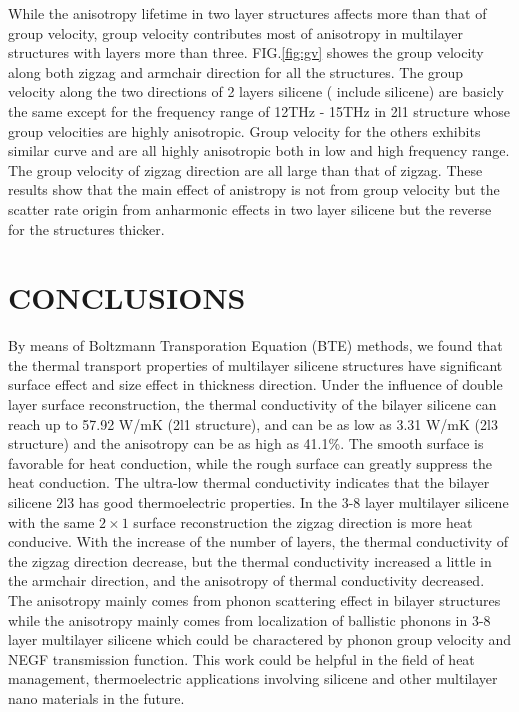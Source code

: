 \documentclass[%
 reprint,
 amsmath,amssymb,
 aps,
 prb,
]{revtex4-1}
\begin{document}
While the anisotropy lifetime in two layer structures affects more than that of group velocity, group velocity contributes most of anisotropy in multilayer structures with layers more than three.  FIG.\ref{fig:gv} showes the group velocity along both zigzag and armchair direction for all the structures. The group velocity  along the two directions of  2 layers silicene ( include silicene) are basicly the same except for the frequency range of 12THz - 15THz in 2l1 structure whose  group velocities are highly anisotropic. Group velocity for the others exhibits similar curve and are all highly anisotropic both in low and high frequency range. The group velocity of zigzag direction are all large than that of zigzag. These results  show that the main effect of anistropy is not from group velocity but the scatter rate origin from anharmonic effects in two layer silicene but the reverse for the structures thicker.



\section{CONCLUSIONS}

By means of Boltzmann Transporation Equation (BTE) methods, we found that the thermal transport properties of multilayer silicene structures have significant surface effect and size effect in thickness direction. Under the influence of double layer surface reconstruction, the thermal conductivity of the bilayer silicene can reach up to 57.92 W/mK (2l1 structure), and can be as low as 3.31 W/mK (2l3 structure) and the anisotropy can be as high as 41.1\%. The smooth surface is favorable for heat conduction, while the rough surface can greatly suppress the heat conduction. The ultra-low thermal conductivity indicates that the bilayer silicene 2l3 has good thermoelectric properties. In the 3-8 layer multilayer silicene with the same $2 \times 1$ surface reconstruction the zigzag direction is more heat conducive. With the increase of the number of layers, the thermal conductivity of the zigzag direction decrease, but the thermal conductivity increased a little in the armchair direction, and the anisotropy of thermal conductivity decreased. The anisotropy mainly comes from phonon scattering effect in bilayer structures while the anisotropy mainly comes from localization of ballistic phonons in 3-8 layer multilayer silicene which could be charactered by phonon group velocity and NEGF transmission function. This work could be helpful in the field of heat management, thermoelectric applications involving silicene and other multilayer nano materials in the future.
\end{document}
